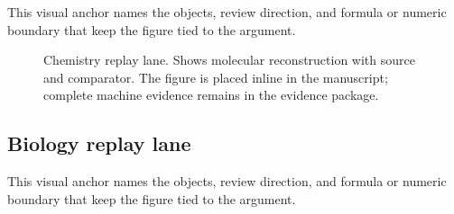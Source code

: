 This visual anchor names the objects, review direction, and formula or numeric boundary that keep the figure tied to the argument.


\begin{figure}[htbp]

\centering


\caption{Chemistry replay lane. Shows molecular reconstruction with source and comparator. The figure is placed inline in the manuscript; complete machine evidence remains in the evidence package.}

\label{fig:r005-inline-28d_oc133_inline_figures_domain_route-2}

\end{figure}

\subsection{Biology replay lane}

This visual anchor names the objects, review direction, and formula or numeric boundary that keep the figure tied to the argument.


